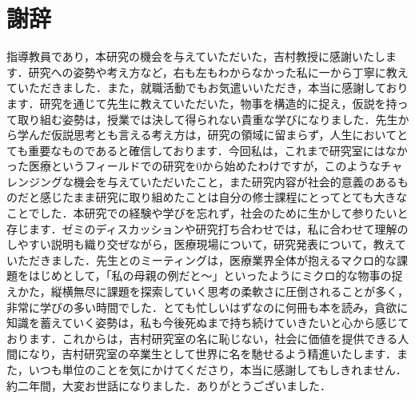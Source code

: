 \chapter{謝辞}

指導教員であり，本研究の機会を与えていただいた，吉村教授に感謝いたします．研究への姿勢や考え方など，右も左もわからなかった私に一から丁寧に教えていただきました．また，就職活動でもお気遣いいただき，本当に感謝しております．研究を通じて先生に教えていただいた，物事を構造的に捉え，仮説を持って取り組む姿勢は，授業では決して得られない貴重な学びになりました．先生から学んだ仮説思考とも言える考え方は，研究の領域に留まらず，人生においてとても重要なものであると確信しております．今回私は，これまで研究室にはなかった医療というフィールドでの研究を0から始めたわけですが，このようなチャレンジングな機会を与えていただいたこと，また研究内容が社会的意義のあるものだと感じたまま研究に取り組めたことは自分の修士課程にとってとても大きなことでした．本研究での経験や学びを忘れず，社会のために生かして参りたいと存じます．ゼミのディスカッションや研究打ち合わせでは，私に合わせて理解のしやすい説明も織り交ぜながら，医療現場について，研究発表について，教えていただきました．先生とのミーティングは，医療業界全体が抱えるマクロ的な課題をはじめとして，「私の母親の例だと〜」といったようにミクロ的な物事の捉えかた，縦横無尽に課題を探索していく思考の柔軟さに圧倒されることが多く，非常に学びの多い時間でした．とても忙しいはずなのに何冊も本を読み，貪欲に知識を蓄えていく姿勢は，私も今後死ぬまで持ち続けていきたいと心から感じております．これからは，吉村研究室の名に恥じない，社会に価値を提供できる人間になり，吉村研究室の卒業生として世界に名を馳せるよう精進いたします．また，いつも単位のことを気にかけてくださり，本当に感謝してもしきれません．約二年間，大変お世話になりました．ありがとうございました．






